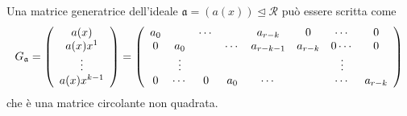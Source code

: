 \begin{corollario} \label{teo:matGenId}
   Una matrice generatrice dell'ideale $\mathfrak{a} = (a(x)) \unlhd \mathcal{R}$ può essere scritta come 
   \begin{align*}
  G_{\mathfrak{a}}
  =  
  \left(
  \begin{array} {c}
    a(x) \\
    a(x)x^{1} \\
    \vdots \\
    a(x)x^{k-1}
  \end{array}
  \right)
  = 
  \left(
  \begin{array} {c c c c c c c c }
  a_{0} & & \cdots & & a_{r-k} & 0 & \cdots & 0   \\
  0 & a_{0} & & \cdots& a_{r-k - 1} & a_{r-k} & 0 \cdots & 0   \\
   & \vdots & &  &  &  & \vdots &    \\
  0 & \cdots & 0 & a_{0} &  \cdots &  & \cdots & a_{r-k} 
  \end{array}
  \right)
  \end{align*}
  che è una matrice circolante non quadrata.
\end{corollario}

